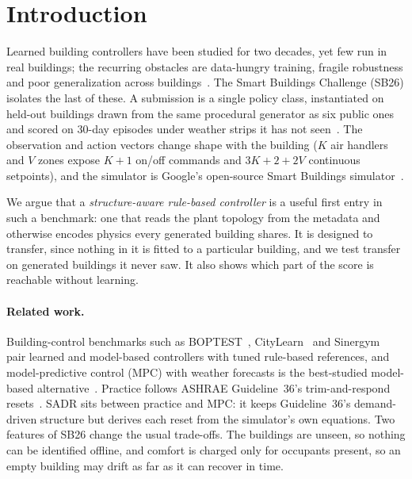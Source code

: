 \documentclass{article}
\begin{document}
\section{Introduction}

Learned building controllers have been studied for two decades, yet few run in real buildings; the recurring obstacles are data-hungry training, fragile robustness and poor generalization across buildings~\citep{wang2020rl}. The Smart Buildings Challenge (SB26) isolates the last of these. A submission is a single policy class, instantiated on held-out buildings drawn from the same procedural generator as six public ones and scored on 30-day episodes under weather strips it has not seen~\citep{sb26kit}. The observation and action vectors change shape with the building ($K$ air handlers and $V$ zones expose $K{+}1$ on/off commands and $3K{+}2{+}2V$ continuous setpoints), and the simulator is Google's open-source Smart Buildings simulator~\citep{goldfeder2023lightweight,goldfeder2025suite}.

We argue that a \emph{structure-aware rule-based controller} is a useful first entry in such a benchmark: one that reads the plant topology from the metadata and otherwise encodes physics every generated building shares. It is designed to transfer, since nothing in it is fitted to a particular building, and we test transfer on generated buildings it never saw. It also shows which part of the score is reachable without learning.

\paragraph{Related work.} Building-control benchmarks such as BOPTEST~\citep{blum2021boptest}, CityLearn~\citep{vazquezcanteli2019citylearn} and Sinergym~\citep{jimenezraboso2021sinergym} pair learned and model-based controllers with tuned rule-based references, and model-predictive control (MPC) with weather forecasts is the best-studied model-based alternative~\citep{oldewurtel2012mpc,drgona2020mpc}. Practice follows ASHRAE Guideline~36's trim-and-respond resets~\citep{ashrae2021g36,taylor2018vav}. SADR sits between practice and MPC: it keeps Guideline~36's demand-driven structure but derives each reset from the simulator's own equations. Two features of SB26 change the usual trade-offs. The buildings are unseen, so nothing can be identified offline, and comfort is charged only for occupants present, so an empty building may drift as far as it can recover in time.
\end{document}
